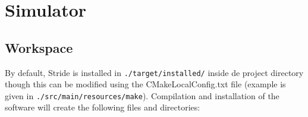 \chapter{Simulator}
\label{chap:simulator}


\section{Workspace}

By default, Stride is installed in \texttt{./target/installed/} inside de project directory though this can be modified using the CMakeLocalConfig.txt file (example is given in \texttt{./src/main/resources/make}).
Compilation and installation of the software will create the following files and directories:

